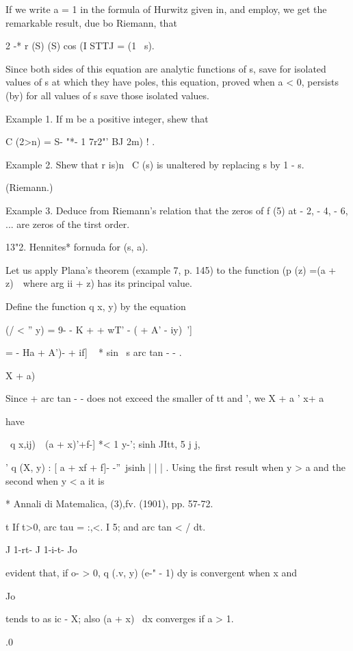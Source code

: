 If we write a = 1 in the formula of Hurwitz given in, and
employ, we get the remarkable result, due bo Riemann, that

2 -* r (S) (S) cos (I STTJ = (1 \ s).

Since both sides of this equation are analytic functions of s, save
for isolated values of s at which they have poles, this equation,
proved when a < 0, persists (by) for all values of s save those
isolated values.

Example 1. If m be a positive integer, shew that

C (2>n) = S- "*- 1 7r2"' BJ 2m) ! .

Example 2. Shew that r is)n~ C (s) is unaltered by replacing s by 1 -
s.

(Riemann.)

Example 3. Deduce from Riemann's relation that the zeros of f (5) at -
2, - 4, - 6, ... are zeros of the tirst order.

13"2. Hennites* fornuda for (s, a).

Let us apply Plana's theorem (example 7, p. 145) to the function (p
(z) =(a + z)~\ where arg ii + z) has its principal value.

Define the function q x, y) by the equation

(/ < '' y) = 9- - K + + wT' - ( + A' - iy)~']

= - Ha + A')- + if] ~ * sin \ s arc tan - - .

  X + a)

Since + arc tan - - does not exceed the smaller of tt and ', we X + a
' x+ a

have

\ q x,ij)\ \ (a + x)'+f-] *< 1 y-'; sinh JItt, 5 j j,

' q (X, y) : [ a + xf + f]- -''\ jsinh | | | . Using the first result
when y > a and the second when y < a it is

* Annali di Matemalica, (3),fv. (1901), pp. 57-72.

t If t>0, arc tau = :,<. I 5; and arc tan < / dt.

J 1-rt- J 1-i-t- Jo

%
%

evident that, if o- > 0, q (.v, y) (e-" - 1) dy is convergent when x
and

Jo

tends to as ic - X; also (a + x)~ dx converges if a > 1.

.0

